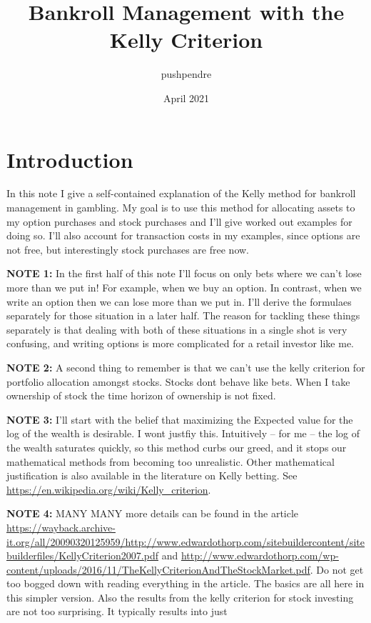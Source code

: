 \documentclass{article}
\title{Bankroll Management with the Kelly Criterion}
\author{pushpendre}
\date{April 2021}
\begin{document}
\maketitle

\section{Introduction}
In this note I give a self-contained explanation of the Kelly method for bankroll management in gambling. My goal is to use this method for allocating assets to my option purchases and stock purchases and I'll give worked out examples for doing so. I'll also account for transaction costs in my examples, since options are not free, but interestingly stock purchases are free now.


\textbf{NOTE 1:} In the first half of this note I'll focus on only bets where we can't lose more than we put in! For example, when we buy an option. In contrast, when we write an option then we can lose more than we put in. I'll derive the formulaes separately for those situation in a later half. The reason for tackling these things separately is that dealing with both of these situations in a single shot is very confusing, and writing options is more complicated for a retail investor like me. 

\textbf{NOTE 2:} A second thing to remember is that we can't use the kelly criterion for portfolio allocation amongst stocks. Stocks dont behave like bets. When I take ownership of stock the time horizon of ownership is not fixed.

\textbf{NOTE 3:} I'll start with the belief that maximizing the Expected value for the log of the wealth is desirable. I wont justfiy this. Intuitively -- for me -- the log of the wealth saturates quickly, so this method curbs our greed, and it stops our mathematical methods from becoming too unrealistic. Other mathematical justification is also available in the literature on Kelly betting. See \url{https://en.wikipedia.org/wiki/Kelly_criterion}.  

\textbf{NOTE 4:} MANY MANY more details can be found in the article \url{https://wayback.archive-it.org/all/20090320125959/http://www.edwardothorp.com/sitebuildercontent/sitebuilderfiles/KellyCriterion2007.pdf} and \url{http://www.edwardothorp.com/wp-content/uploads/2016/11/TheKellyCriterionAndTheStockMarket.pdf}. Do not get too bogged down with reading everything in the article. The basics are all here in this simpler version. Also the results from the kelly criterion for stock investing are not too surprising. It typically results into just 
\end{document}
